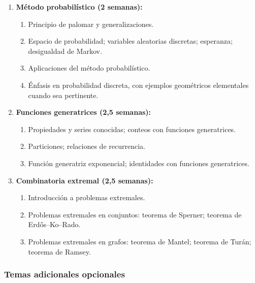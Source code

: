 \begin{refsection}
\begin{enumerate}
\item \textbf{Método probabilístico (2 semanas):}
\begin{enumerate}
    \item Principio de palomar y generalizaciones.
    \item Espacio de probabilidad; variables aleatorias discretas; esperanza; desigualdad de Markov.
    \item Aplicaciones del método probabilístico.
    \item Énfasis en probabilidad discreta, con ejemplos geométricos elementales cuando sea pertinente.
\end{enumerate}

\item \textbf{Funciones generatrices (2{,}5 semanas):}
\begin{enumerate}
    \item Propiedades y series conocidas; conteos con funciones generatrices.
    \item Particiones; relaciones de recurrencia.
    \item Función generatriz exponencial; identidades con funciones generatrices.
\end{enumerate}

\item \textbf{Combinatoria extremal (2{,}5 semanas):}
\begin{enumerate}
    \item Introducción a problemas extremales.
    \item Problemas extremales en conjuntos: teorema de Sperner; teorema de Erd\H{o}s--Ko--Rado.
    \item Problemas extremales en grafos: teorema de Mantel; teorema de Turán; teorema de Ramsey.
\end{enumerate}
\end{enumerate}

\subsubsection*{Temas adicionales opcionales}


\end{refsection}
